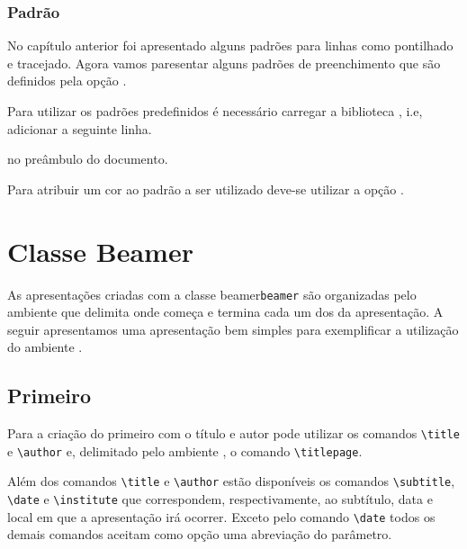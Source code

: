 \subsubsection{Padr\~{a}o}
No cap\'{i}tulo anterior foi apresentado alguns padr\~{o}es para linhas como pontilhado e tracejado. Agora vamos paresentar alguns padr\~{o}es de preenchimento que s\~{a}o definidos pela op\c{c}\~{a}o .

Para utilizar os padr\~{o}es predefinidos \'{e} necess\'{a}rio carregar a biblioteca , i.e, adicionar a seguinte linha.
\begin{code}
\usetikzlibrary{patterns}
\end{code}
no pre\^{a}mbulo do documento. \\

Para atribuir um cor ao padr\~{a}o a ser utilizado deve-se utilizar a op\c{c}\~{a}o . \\

\section{Classe Beamer}
As apresenta\c{c}\~{o}es criadas com a classe beamer\lstinline{beamer} s\~{a}o organizadas pelo ambiente  que delimita onde come\c{c}a e termina cada um dos  da apresenta\c{c}\~{a}o. A seguir apresentamos uma apresenta\c{c}\~{a}o bem simples para exemplificar a utiliza\c{c}\~{a}o do ambiente . \\

\subsection{Primeiro }
Para a cria\c{c}\~{a}o do primeiro  com o t\'{i}tulo e autor pode utilizar os comandos \lstinline!\title! e \lstinline!\author! e, delimitado pelo ambiente , o comando \lstinline!\titlepage!.

Al\'{e}m dos comandos \lstinline!\title! e \lstinline!\author! est\~{a}o dispon\'{i}veis os comandos \lstinline!\subtitle!, \lstinline!\date! e \lstinline!\institute! que correspondem, respectivamente, ao subt\'{i}tulo, data e local em que a apresenta\c{c}\~{a}o ir\'{a} ocorrer. Exceto pelo comando \lstinline!\date! todos os demais comandos aceitam como op\c{c}\~{a}o uma abrevia\c{c}\~{a}o do par\^{a}metro. \\

